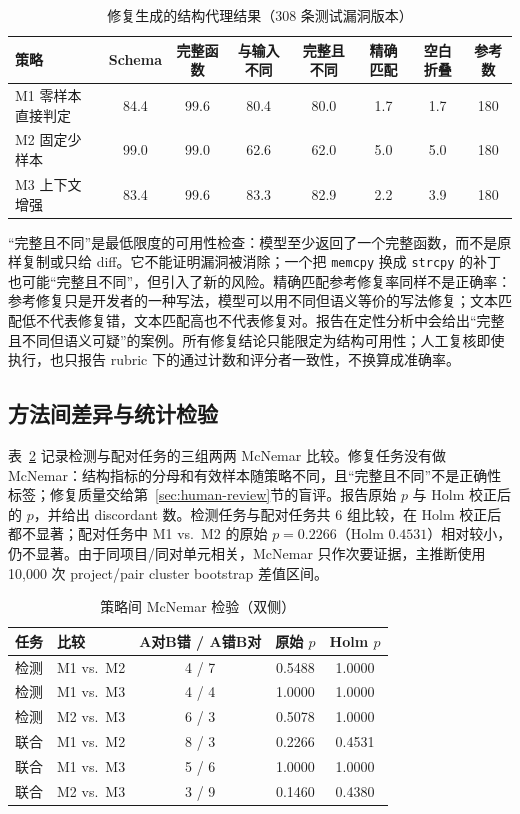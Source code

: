 \documentclass[conference]{IEEEtran}
\begin{document}
\begin{table}[t]
\caption{修复生成的结构代理结果（308 条测试漏洞版本）}
\label{tab:repair}
\centering
\small
\begin{tabular}{@{}lccccccc@{}}
\toprule
策略 & Schema & 完整函数 & 与输入不同 & 完整且不同 & 精确匹配 & 空白折叠 & 参考数\\
\midrule
M1 零样本直接判定 & 84.4 & 99.6 & 80.4 & 80.0 & 1.7 & 1.7 & 180\\
M2 固定少样本 & 99.0 & 99.0 & 62.6 & 62.0 & 5.0 & 5.0 & 180\\
M3 上下文增强 & 83.4 & 99.6 & 83.3 & 82.9 & 2.2 & 3.9 & 180\\
\bottomrule
\end{tabular}
\end{table}

“完整且不同”是最低限度的可用性检查：模型至少返回了一个完整函数，而不是原样复制或只给 diff。它不能证明漏洞被消除；一个把 \texttt{memcpy} 换成 \texttt{strcpy} 的补丁也可能“完整且不同”，但引入了新的风险。精确匹配参考修复率同样不是正确率：参考修复只是开发者的一种写法，模型可以用不同但语义等价的写法修复；文本匹配低不代表修复错，文本匹配高也不代表修复对。报告在定性分析中会给出“完整且不同但语义可疑”的案例。所有修复结论只能限定为结构可用性；人工复核即使执行，也只报告 rubric 下的通过计数和评分者一致性，不换算成准确率。

\subsection{方法间差异与统计检验}
表~\ref{tab:mcnemar} 记录检测与配对任务的三组两两 McNemar 比较。修复任务没有做 McNemar：结构指标的分母和有效样本随策略不同，且“完整且不同”不是正确性标签；修复质量交给第~\ref{sec:human-review}节的盲评。报告原始 $p$ 与 Holm 校正后的 $p$，并给出 discordant 数。检测任务与配对任务共 6 组比较，在 Holm 校正后都不显著；配对任务中 M1 vs.\ M2 的原始 $p=0.2266$（Holm $0.4531$）相对较小，仍不显著。由于同项目/同对单元相关，McNemar 只作次要证据，主推断使用 10{,}000 次 project/pair cluster bootstrap 差值区间。

\begin{table}[t]
\caption{策略间 McNemar 检验（双侧）}
\label{tab:mcnemar}
\centering
\scriptsize
\begin{tabular}{@{}llccc@{}}
\toprule
任务 & 比较 & A对B错 / A错B对 & 原始 $p$ & Holm $p$\\
\midrule
检测 & M1 vs.\ M2 & 4 / 7 & 0.5488 & 1.0000\\
检测 & M1 vs.\ M3 & 4 / 4 & 1.0000 & 1.0000\\
检测 & M2 vs.\ M3 & 6 / 3 & 0.5078 & 1.0000\\
联合 & M1 vs.\ M2 & 8 / 3 & 0.2266 & 0.4531\\
联合 & M1 vs.\ M3 & 5 / 6 & 1.0000 & 1.0000\\
联合 & M2 vs.\ M3 & 3 / 9 & 0.1460 & 0.4380\\
\bottomrule
\end{tabular}
\end{table}
\end{document}
